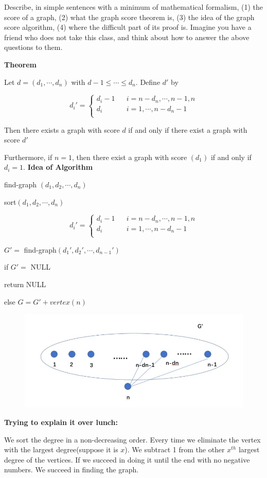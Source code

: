 \begin{exercise}
  Describe, in simple sentences with a minimum of mathematical formalism, (1) the score
  of a graph, (2) what the graph score theorem is, (3) the idea of the 
  graph score algorithm, (4) where the difficult part of its proof is.
  Imagine you have a friend who does not take this class, and think about how to answer
  the above questions to them.
\end{exercise} 

\textbf{Theorem}
\par Let $d=(d_1,\cdots,d_n)$ with $d-1\le\cdots\le d_n$. Define $d'$ by
\begin{center}
$$ d_i'=\left\{
\begin{array}{rcl}
d_i-1       &      & {i=n-d_n,\cdots,n-1,n}\\
d_i         &      & {i=1,\cdots,n-d_n-1}\\
\end{array} \right. $$
\end{center}
\par Then there exists a graph with score $d$ if and only if there exist a graph with score $d'$
\par Furthermore, if $n=1$, then there exist a graph with score $(d_1)$ if and only if $d_i=1$.
\textbf{Idea of Algorithm}
\par find-graph $(d_1,d_2,\cdots,d_n)$
\par sort$(d_1,d_2,\cdots,d_n)$
\begin{center}
$$ d_i'=\left\{
\begin{array}{rcl}
d_i-1       &      & {i=n-d_n,\cdots,n-1,n}\\
d_i         &      & {i=1,\cdots,n-d_n-1}\\
\end{array} \right. $$
\end{center}
\par $G'=$ find-graph$(d_1',d_2',\cdots,d_{n-1}')$
\par if $G'=$ NULL
\par return NULL
\par else $G=G'+vertex(n)$
\begin{figure}[hpbt]
\begin{center}
\includegraphics[width = 0.8 \textwidth]{score.png}
\end{center}
\end{figure}
\textbf{Trying to explain it over lunch:}
\par We sort the degree in a non-decreasing order. Every time we eliminate the vertex with the largest degree(suppose it is $x$). We subtract 1 from the other $x^{th}$ largest degree of the vertices. If we succeed in doing it until the end with no negative numbers. We succeed in finding the graph.



